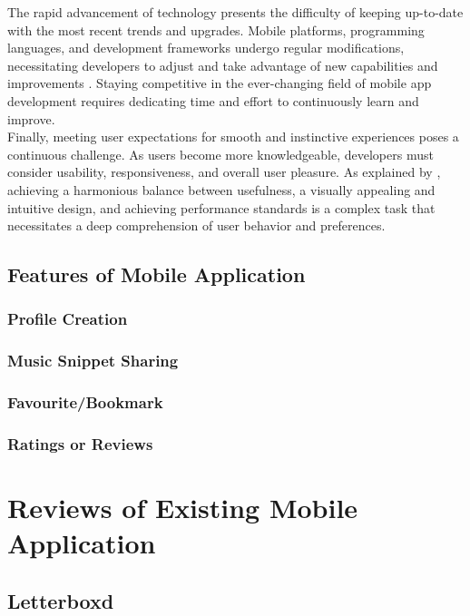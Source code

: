 The rapid advancement of technology presents the difficulty of keeping up-to-date with the most recent trends and upgrades. Mobile platforms, programming languages, and development frameworks undergo regular modifications, necessitating developers to adjust and take advantage of new capabilities and improvements \parencite{syeed21}. Staying competitive in the ever-changing field of mobile app development requires dedicating time and effort to continuously learn and improve. \\

Finally, meeting user expectations for smooth and instinctive experiences poses a continuous challenge. As users become more knowledgeable, developers must consider usability, responsiveness, and overall user pleasure. As explained by \textcite{olawole18}, achieving a harmonious balance between usefulness, a visually appealing and intuitive design, and achieving performance standards is a complex task that necessitates a deep comprehension of user behavior and preferences.

\subsection{Features of Mobile Application}

\subsubsection{Profile Creation}

\subsubsection{Music Snippet Sharing}

\subsubsection{Favourite/Bookmark}

\subsubsection{Ratings or Reviews}

\section{Reviews of Existing Mobile Application}

\subsection{Letterboxd}

